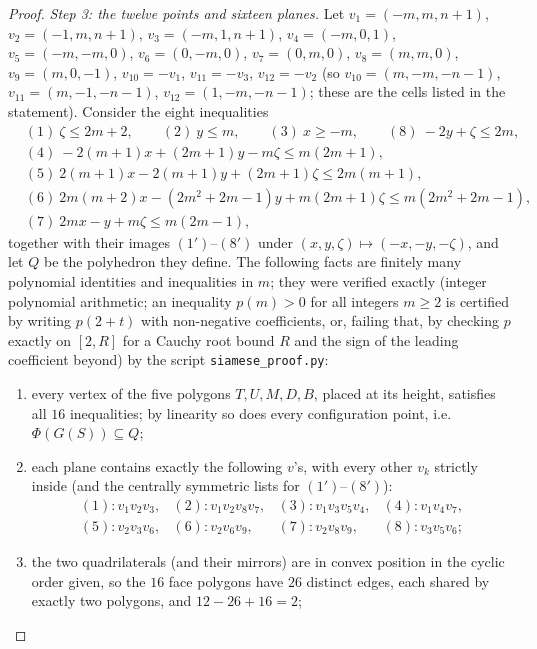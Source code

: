 \begin{proof}
\emph{Step 3: the twelve points and sixteen planes.}  Let
$v_1=(-m,m,n{+}1)$, $v_2=(-1,m,n{+}1)$, $v_3=(-m,1,n{+}1)$, $v_4=(-m,0,1)$,
$v_5=(-m,-m,0)$, $v_6=(0,-m,0)$, $v_7=(0,m,0)$, $v_8=(m,m,0)$, $v_9=(m,0,-1)$,
$v_{10}=-v_1$, $v_{11}=-v_3$, $v_{12}=-v_2$ (so $v_{10}=(m,-m,-n-1)$,
$v_{11}=(m,-1,-n-1)$, $v_{12}=(1,-m,-n-1)$; these are the cells listed in
the statement).  Consider the eight inequalities
\begin{align*}
&(1)\ \zeta\le 2m+2, \qquad (2)\ y\le m, \qquad (3)\ x\ge -m, \qquad (8)\ -2y+\zeta\le 2m,\\
&(4)\ -2(m{+}1)x+(2m{+}1)y-m\zeta\le m(2m{+}1),\\
&(5)\ 2(m{+}1)x-2(m{+}1)y+(2m{+}1)\zeta\le 2m(m{+}1),\\
&(6)\ 2m(m{+}2)x-(2m^2{+}2m{-}1)y+m(2m{+}1)\zeta\le m(2m^2{+}2m{-}1),\\
&(7)\ 2mx-y+m\zeta\le m(2m{-}1),
\end{align*}
together with their images $(1')$--$(8')$ under $(x,y,\zeta)\mapsto
(-x,-y,-\zeta)$, and let $Q$ be the polyhedron they define.  The following
facts are finitely many polynomial identities and inequalities in $m$; they
were verified exactly (integer polynomial arithmetic; an inequality
$p(m)>0$ for all integers $m\ge2$ is certified by writing $p(2+t)$ with
non-negative coefficients, or, failing that, by checking $p$ exactly on
$[2,R]$ for a Cauchy root bound $R$ and the sign of the leading coefficient
beyond) by the script \texttt{siamese\_proof.py}:
\begin{enumerate}
\item[(a)] every vertex of the five polygons $T,U,M,D,B$, placed at its
  height, satisfies all $16$ inequalities; by linearity so does every
  configuration point, i.e.\ $\Phi(G(S))\subseteq Q$;
\item[(b)] each plane contains exactly the following $v$'s, with every other
  $v_k$ strictly inside (and the centrally symmetric lists for
  $(1')$--$(8')$):
  \[
  \begin{array}{llll}
  (1)\colon v_1v_2v_3, & (2)\colon v_1v_2v_8v_7, & (3)\colon v_1v_3v_5v_4, & (4)\colon v_1v_4v_7,\\
  (5)\colon v_2v_3v_6, & (6)\colon v_2v_6v_9, & (7)\colon v_2v_8v_9, & (8)\colon v_3v_5v_6;
  \end{array}
  \]
\item[(c)] the two quadrilaterals (and their mirrors) are in convex position
  in the cyclic order given, so the $16$ face polygons have $26$ distinct
  edges, each shared by exactly two polygons, and $12-26+16=2$;

\end{enumerate}
\end{proof}
